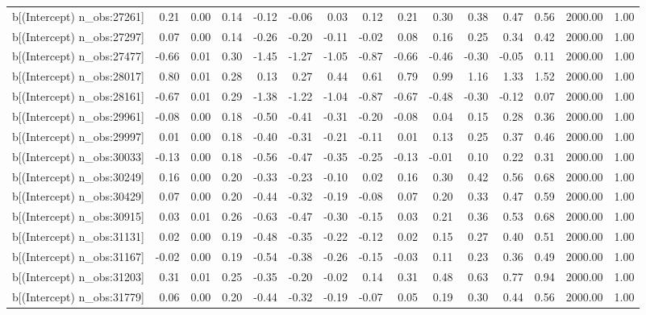 \begin{table}[ht]
\begin{tabular}{rrrrrrrrrrrrrrr}
  b[(Intercept) n\_obs:27261] & 0.21 & 0.00 & 0.14 & -0.12 & -0.06 & 0.03 & 0.12 & 0.21 & 0.30 & 0.38 & 0.47 & 0.56 & 2000.00 & 1.00 \\ 
  b[(Intercept) n\_obs:27297] & 0.07 & 0.00 & 0.14 & -0.26 & -0.20 & -0.11 & -0.02 & 0.08 & 0.16 & 0.25 & 0.34 & 0.42 & 2000.00 & 1.00 \\ 
  b[(Intercept) n\_obs:27477] & -0.66 & 0.01 & 0.30 & -1.45 & -1.27 & -1.05 & -0.87 & -0.66 & -0.46 & -0.30 & -0.05 & 0.11 & 2000.00 & 1.00 \\ 
  b[(Intercept) n\_obs:28017] & 0.80 & 0.01 & 0.28 & 0.13 & 0.27 & 0.44 & 0.61 & 0.79 & 0.99 & 1.16 & 1.33 & 1.52 & 2000.00 & 1.00 \\ 
  b[(Intercept) n\_obs:28161] & -0.67 & 0.01 & 0.29 & -1.38 & -1.22 & -1.04 & -0.87 & -0.67 & -0.48 & -0.30 & -0.12 & 0.07 & 2000.00 & 1.00 \\ 
  b[(Intercept) n\_obs:29961] & -0.08 & 0.00 & 0.18 & -0.50 & -0.41 & -0.31 & -0.20 & -0.08 & 0.04 & 0.15 & 0.28 & 0.36 & 2000.00 & 1.00 \\ 
  b[(Intercept) n\_obs:29997] & 0.01 & 0.00 & 0.18 & -0.40 & -0.31 & -0.21 & -0.11 & 0.01 & 0.13 & 0.25 & 0.37 & 0.46 & 2000.00 & 1.00 \\ 
  b[(Intercept) n\_obs:30033] & -0.13 & 0.00 & 0.18 & -0.56 & -0.47 & -0.35 & -0.25 & -0.13 & -0.01 & 0.10 & 0.22 & 0.31 & 2000.00 & 1.00 \\ 
  b[(Intercept) n\_obs:30249] & 0.16 & 0.00 & 0.20 & -0.33 & -0.23 & -0.10 & 0.02 & 0.16 & 0.30 & 0.42 & 0.56 & 0.68 & 2000.00 & 1.00 \\ 
  b[(Intercept) n\_obs:30429] & 0.07 & 0.00 & 0.20 & -0.44 & -0.32 & -0.19 & -0.08 & 0.07 & 0.20 & 0.33 & 0.47 & 0.59 & 2000.00 & 1.00 \\ 
  b[(Intercept) n\_obs:30915] & 0.03 & 0.01 & 0.26 & -0.63 & -0.47 & -0.30 & -0.15 & 0.03 & 0.21 & 0.36 & 0.53 & 0.68 & 2000.00 & 1.00 \\ 
  b[(Intercept) n\_obs:31131] & 0.02 & 0.00 & 0.19 & -0.48 & -0.35 & -0.22 & -0.12 & 0.02 & 0.15 & 0.27 & 0.40 & 0.51 & 2000.00 & 1.00 \\ 
  b[(Intercept) n\_obs:31167] & -0.02 & 0.00 & 0.19 & -0.54 & -0.38 & -0.26 & -0.15 & -0.03 & 0.11 & 0.23 & 0.36 & 0.49 & 2000.00 & 1.00 \\ 
  b[(Intercept) n\_obs:31203] & 0.31 & 0.01 & 0.25 & -0.35 & -0.20 & -0.02 & 0.14 & 0.31 & 0.48 & 0.63 & 0.77 & 0.94 & 2000.00 & 1.00 \\ 
  b[(Intercept) n\_obs:31779] & 0.06 & 0.00 & 0.20 & -0.44 & -0.32 & -0.19 & -0.07 & 0.05 & 0.19 & 0.30 & 0.44 & 0.56 & 2000.00 & 1.00 \\ 

\end{tabular}
\end{table}
